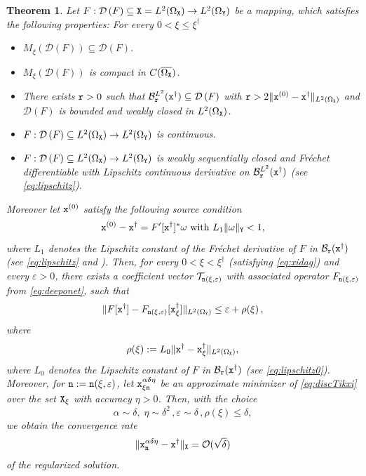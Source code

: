 \documentclass[10pt]{article}
\numberwithin{equation}{section}
\newtheorem{theorem}[theorem]{Theorem}
\theoremstyle{nonumberplain}
\newcommand{\dom}[1]{\mathcal{D}\left(#1\right)}
\newcommand{\norms}[1]{\|#1\|}
\newcommand{\ve}{\varepsilon}
\newcommand{\X}{{\tt X}}
\newcommand{\Y}{{\tt Y}}
\newcommand{\n}{{\tt n}}
\newcommand{\x}{{\tt x}}
\newcommand{\xdag}{\x^\dagger}
\begin{document}
\begin{theorem} \label{thm:lebesguenonlin}
		Let $F: \dom{F} \subseteq \X= L^2(\Omega_\X) \to L^2(\Omega_\Y)$ be a mapping, which satisfies the following properties: For every $0 < \xi \leq \xi^\dagger$
\begin{itemize}
		\item $M_\xi(\dom{F}) \subseteq \dom{F}$.
		\item $M_\xi(\dom{F})$ is compact in $C(\overline{\Omega_\X})$.
		\item  There exists ${\tt r}>0$ such that $\mathcal{B}_{\tt r}^{L^2}(\xdag) \subseteq \dom{F}$ with  ${\tt r} > 2\norms{\x^{(0)}-\xdag}_{L^2(\Omega_\X)}$ and $\dom{F}$ is bounded and weakly closed in $L^2(\Omega_\X)$.
		\item $F : \dom{F} \subseteq L^2(\Omega_\X) \to L^2(\Omega_\Y)$ is continuous.
		\item $F : \dom{F} \subseteq L^2(\Omega_\X) \to L^2(\Omega_\Y)$ is weakly sequentially closed and Fr\'echet differentiable with Lipschitz continuous derivative on $\mathcal{B}^{L^2}_{\tt r}(\xdag)$ (see \autoref{eq:lipschitz}).
\end{itemize}
Moreover let $\x^{(0)}$ satisfy the following source condition
	\begin{equation} \label{eq:sourcenl2}
		\x^{(0)}-\xdag = F'[\xdag]^* \omega \text{ with } L_1\norms{\omega}_\Y < 1,
	\end{equation}
	where $L_1$ denotes the Lipschitz constant of the Fr\'echet derivative of $F$ in $\mathcal{B}_{\tt r}(\xdag)$ (see \autoref{eq:lipschitz} and \cite{NeuSch90}).
Then, for every $0 < \xi < \xi^\dagger$ (satisfying \autoref{eq:xidag}) and every $\ve > 0$, there exists a coefficient vector $\mathcal{T}_{\n(\xi,\ve)}$ with associated operator $F_{\n(\xi,\ve)}$ from \autoref{eq:deeponet}, such that	
	\begin{equation}\label{eq:deeponeterror_l2_dup}
		\norms{F[\xdag] - F_{\n(\xi,\ve)}[\x_{\xi}^\dagger]}_{L^2(\Omega_\Y)} \leq \ve + \rho(\xi)\,, 
	\end{equation} 
	where
	\begin{equation} \label{eq:rhoxi}
			\rho(\xi) := L_0 \norms{\xdag - \xdag_{\xi}}_{L^2(\Omega_\X)},
	\end{equation}
	where $L_0$ denotes the Lipschitz constant of $F$ in $\mathcal{B}_{\tt r}(\xdag)$ (see \autoref{eq:lipschitz0}).
Moreover, for $\n := \n(\xi,\ve)$, let $\x_{\xi\n}^{\alpha\delta\eta}$ be an approximate minimizer of \autoref{eq:discTikxi} over the set $\X_\xi$ with accuracy $\eta > 0$. Then,
	with the choice 
	\begin{equation} \label{eq:choicel2}
		\alpha \sim \delta, \; \eta \sim \delta^2 \,, \ve \sim \delta \,, \rho(\xi) \leq \delta,
	\end{equation}
	we obtain the convergence rate 
	\begin{equation} \label{eq:ratel2}
		\norms{\x_\n^{\alpha\delta\eta}-\xdag}_{\X} = \mathcal{O}(\sqrt{\delta}) 
	\end{equation} 
	of the regularized solution.
\end{theorem}
\end{document}
